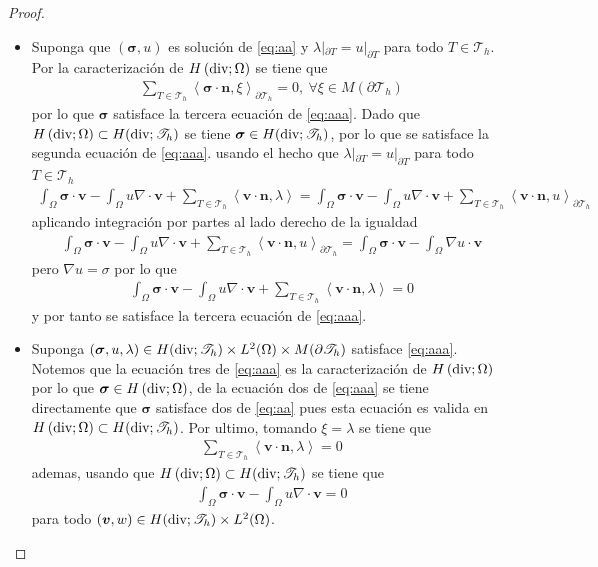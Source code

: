 \documentclass[10pt,a4paper]{report}
\newcommand{\bs}{\boldsymbol}
\newcommand{\Th}{\mathscr{T}_{h}}
\newcommand{\Hdiv}{H\left(\textup{div};\Omega\right)}
\newcommand{\Hdivt}{H(\textup{div};\mathscr{T}_{h})}
\providecommand{\PI}[2]{\left\langle #1,#2  \right\rangle}
\begin{document}
    \begin{proof}
    	\begin{itemize} Por doble implicación
    		\item[$(\Longrightarrow)$] Suponga que $(\bs{\sigma},u)$ es solución de \eqref{eq:aa} y $\lambda|_{\partial T} = u|_{\partial T}$ para todo $T\in\Th$. Por la caracterización de $\Hdiv$ se tiene que 
    		\begin{align*}
    			\sum_{T\in\mathscr{T}_{h}}\PI{\bs{\sigma}\cdot\bs{n}}{\xi}_{\partial\Th} = 0,\ \forall\xi\in M(\partial\Th)
    		\end{align*}
    	    por lo que $\bs{\sigma}$ satisface la tercera ecuación de \eqref{eq:aaa}. Dado que $\Hdiv\subset\Hdivt$ se tiene $\bs{\sigma}\in\Hdivt$, por lo que se satisface la segunda ecuación de \eqref{eq:aaa}. usando el hecho que $\lambda|_{\partial T} = u|_{\partial T}$ para todo $T\in\Th$
    	    \begin{align*}
    	    	\displaystyle\int_{\Omega}\bs{\sigma}\cdot\bs{v} - \int_{\Omega}u\nabla\cdot\bs{v} + \sum_{T\in\mathscr{T}_{h}}\PI{\bs{v}\cdot\bs{n}}{\lambda} = \displaystyle\int_{\Omega}\bs{\sigma}\cdot\bs{v} - \int_{\Omega}u\nabla\cdot\bs{v} + \sum_{T\in\mathscr{T}_{h}}\PI{\bs{v}\cdot\bs{n}}{u}_{\partial\Th}
    	    \end{align*}
            aplicando integración por partes al lado derecho de la igualdad
            \begin{align*}
            	\int_{\Omega}\bs{\sigma}\cdot\bs{v} - \int_{\Omega}u\nabla\cdot\bs{v} + \sum_{T\in\mathscr{T}_{h}}\PI{\bs{v}\cdot\bs{n}}{u}_{\partial\Th} = \int_{\Omega}\bs{\sigma}\cdot\bs{v} - \int_{\Omega}\nabla u\cdot\bs{v}
            \end{align*}
            pero $\nabla u = \sigma$ por lo que
            \begin{align*}
            	\int_{\Omega}\bs{\sigma}\cdot\bs{v} - \int_{\Omega}u\nabla\cdot\bs{v} + \sum_{T\in\mathscr{T}_{h}}\PI{\bs{v}\cdot\bs{n}}{\lambda} = 0
            \end{align*}
            y por tanto se satisface la tercera ecuación de \eqref{eq:aaa}.
            \item[$(\Longrightarrow)$] Suponga $(\bs{\sigma},u,\lambda)\in\Hdivt\times L^{2}(\Omega)\times M(\partial\Th)$ satisface \eqref{eq:aaa}. Notemos que la ecuación tres de \eqref{eq:aaa} es la caracterización de $\Hdiv$ por lo que $\bs{\sigma}\in \Hdiv$, de la ecuación dos de \eqref{eq:aaa} se tiene directamente que $\bs{\sigma}$ satisface dos de \eqref{eq:aa} pues esta ecuación es valida en $\Hdiv\subset\Hdivt$. Por ultimo, tomando $\xi = \lambda$ se tiene que 
            \begin{align*}
            	\sum_{T\in\mathscr{T}_{h}}\PI{\bs{v}\cdot\bs{n}}{\lambda} = 0
            \end{align*} 
            ademas, usando que $\Hdiv\subset\Hdivt$ se tiene que
            \begin{align*}
            	\int_{\Omega}\bs{\sigma}\cdot\bs{v} - \int_{\Omega}u\nabla\cdot\bs{v} = 0
            \end{align*}
            para todo $(\bs{v},w)\in\Hdivt\times L^{2}(\Omega)$.
    	\end{itemize}
    \end{proof}
\end{document}
